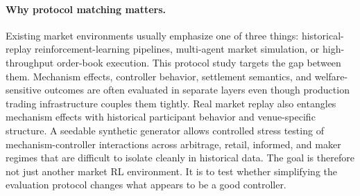 \documentclass[11pt]{article}
\begin{document}
\paragraph{Why protocol matching matters.}
Existing market environments usually emphasize one of three things: historical-replay reinforcement-learning pipelines, multi-agent market simulation, or high-throughput order-book execution. This protocol study targets the gap between them. Mechanism effects, controller behavior, settlement semantics, and welfare-sensitive outcomes are often evaluated in separate layers even though production trading infrastructure couples them tightly. Real market replay also entangles mechanism effects with historical participant behavior and venue-specific structure. A seedable synthetic generator allows controlled stress testing of mechanism-controller interactions across arbitrage, retail, informed, and maker regimes that are difficult to isolate cleanly in historical data. The goal is therefore not just another market RL environment. It is to test whether simplifying the evaluation protocol changes what appears to be a good controller.

\begin{table}[t]
\centering
\footnotesize
{}
\caption{Positioning relative to existing market-environment families. The distinctive feature is a learning-facing evaluation protocol with explicit settlement invariants, mechanism variation, and retail-outcome summaries in the same loop.}
\end{table}
\end{document}
